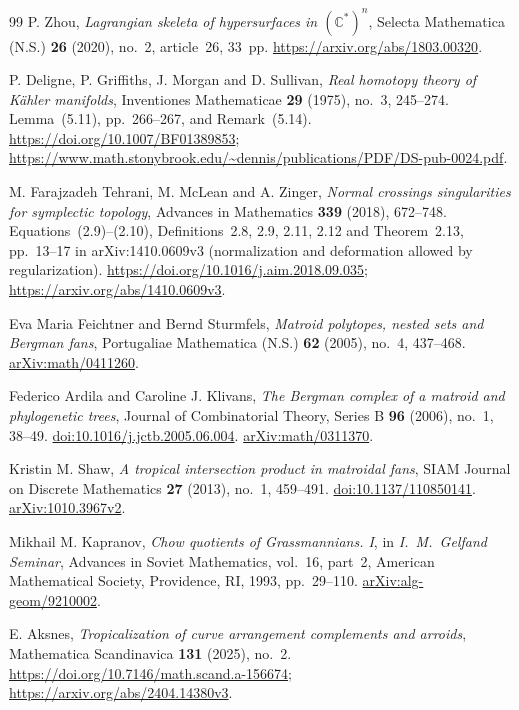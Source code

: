 \begin{thebibliography}{99}
P. Zhou,
\emph{Lagrangian skeleta of hypersurfaces in $(\mathbb C^*)^n$},
Selecta Mathematica (N.S.) \textbf{26} (2020), no.~2, article~26, 33~pp.
\url{https://arxiv.org/abs/1803.00320}.


P. Deligne, P. Griffiths, J. Morgan and D. Sullivan,
\emph{Real homotopy theory of K\"ahler manifolds},
Inventiones Mathematicae \textbf{29} (1975), no.~3, 245--274.
Lemma~(5.11), pp.~266--267, and Remark~(5.14).
\url{https://doi.org/10.1007/BF01389853};
\url{https://www.math.stonybrook.edu/~dennis/publications/PDF/DS-pub-0024.pdf}.

M. Farajzadeh Tehrani, M. McLean and A. Zinger,
\emph{Normal crossings singularities for symplectic topology},
Advances in Mathematics \textbf{339} (2018), 672--748.
Equations~(2.9)--(2.10), Definitions~2.8, 2.9, 2.11, 2.12 and Theorem~2.13,
pp.~13--17 in arXiv:1410.0609v3 (normalization and deformation allowed by regularization).
\url{https://doi.org/10.1016/j.aim.2018.09.035};
\url{https://arxiv.org/abs/1410.0609v3}.

Eva Maria Feichtner and Bernd Sturmfels,
\emph{Matroid polytopes, nested sets and Bergman fans},
Portugaliae Mathematica (N.S.) \textbf{62} (2005), no.~4, 437--468.
\href{https://arxiv.org/abs/math/0411260}{arXiv:math/0411260}.

Federico Ardila and Caroline J. Klivans,
\emph{The Bergman complex of a matroid and phylogenetic trees},
Journal of Combinatorial Theory, Series B \textbf{96} (2006), no.~1, 38--49.
\href{https://doi.org/10.1016/j.jctb.2005.06.004}{doi:10.1016/j.jctb.2005.06.004}.
\href{https://arxiv.org/abs/math/0311370}{arXiv:math/0311370}.

Kristin M. Shaw,
\emph{A tropical intersection product in matroidal fans},
SIAM Journal on Discrete Mathematics \textbf{27} (2013), no.~1, 459--491.
\href{https://doi.org/10.1137/110850141}{doi:10.1137/110850141}.
\href{https://arxiv.org/abs/1010.3967v2}{arXiv:1010.3967v2}.

Mikhail M. Kapranov,
\emph{Chow quotients of Grassmannians. I},
in \emph{I.~M.~Gelfand Seminar},
Advances in Soviet Mathematics, vol.~16, part~2,
American Mathematical Society, Providence, RI, 1993, pp.~29--110.
\href{https://arxiv.org/abs/alg-geom/9210002}{arXiv:alg-geom/9210002}.

E. Aksnes,
\emph{Tropicalization of curve arrangement complements and arroids},
Mathematica Scandinavica \textbf{131} (2025), no.~2.
\url{https://doi.org/10.7146/math.scand.a-156674};
\url{https://arxiv.org/abs/2404.14380v3}.


\end{thebibliography}
